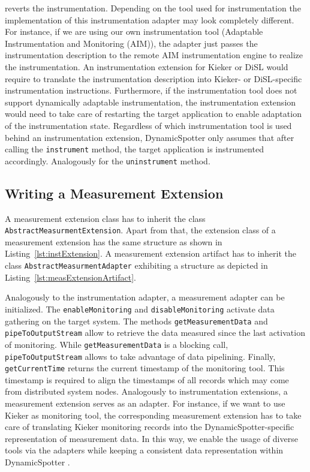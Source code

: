 \documentclass{report}
\newcommand{\DS}{DynamicSpotter }
\begin{document}
reverts the instrumentation. Depending on the tool used for instrumentation the implementation of this instrumentation
adapter may look completely different. For instance, if we are using our own instrumentation tool (Adaptable
Instrumentation and Monitoring (AIM)), the adapter just passes the instrumentation description to the remote
AIM instrumentation engine to realize the instrumentation. An instrumentation extension for Kieker or DiSL would require
to translate the instrumentation description into Kieker- or DiSL-specific instrumentation instructions. Furthermore, if
the instrumentation tool does not support dynamically adaptable instrumentation, the instrumentation extension would
need to take care of restarting the target application to enable adaptation of the instrumentation state.
Regardless of which instrumentation tool is used behind an instrumentation extension, \DS only assumes that after
calling the \texttt{instrument} method, the target application is instrumented accordingly. Analogously for the
\texttt{uninstrument} method.


\subsection{Writing a Measurement Extension}
A measurement extension class has to inherit the class \texttt{AbstractMeasurmentExtension}. Apart from that, the
extension class of a measurement extension has the same structure as shown in Listing~\ref{lst:instExtension}. A
measurement extension artifact has to inherit the class \texttt{AbstractMeasurmentAdapter} exhibiting a structure as
depicted in Listing~\ref{lst:measExtensionArtifact}.

Analogously to the instrumentation adapter, a measurement adapter can be initialized. The \texttt{enableMonitoring} and
\texttt{disableMonitoring} activate data gathering on the target system. The methods \texttt{getMeasurementData} and
\texttt{pipeToOutputStream} allow to retrieve the data measured since the last activation of monitoring. While
\texttt{getMeasurementData} is a blocking call, \texttt{pipeToOutputStream} allows to take advantage of data pipelining.
Finally, \texttt{getCurrentTime} returns the current timestamp of the monitoring tool. This timestamp is required to
align the timestamps of all records which may come from distributed system nodes.
Analogously to instrumentation extensions, a measurement extension serves as an adapter. For instance, if we want
to use Kieker as monitoring tool, the corresponding measurement extension has to take care of translating Kieker
monitoring records into the DynamicSpotter-specific representation of measurement data. In this way, we enable the usage
of diverse tools via the adapters while keeping a consistent data representation within \DS.
\end{document}
